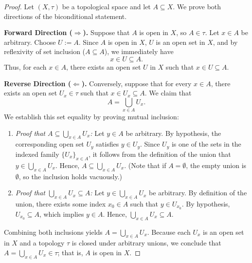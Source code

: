 
\begin{proof}
Let $(X,\tau)$ be a topological space and let $A\subseteq X$. We prove both directions of the
biconditional statement.

\textbf{Forward Direction ($\Longrightarrow$).} Suppose that $A$ is open in $X$, so $A\in\tau$.
Let $x\in A$ be arbitrary. Choose $U:=A$. Since $A$ is open in $X$, $U$ is an open set in $X$,
and by reflexivity of set inclusion ($A\subseteq A$), we immediately have
\[ x\in U\subseteq A. \]
Thus, for each $x\in A$, there exists an open set $U$ in $X$ such that $x\in U\subseteq A$.

\textbf{Reverse Direction ($\Longleftarrow$).} Conversely, suppose that for every $x\in A$,
there exists an open set $U_x\in\tau$ such that $x\in U_x\subseteq A$. We claim that
\[ A=\bigcup_{x\in A}U_x. \]
We establish this set equality by proving mutual inclusion:
\begin{enumerate}
  \item \emph{Proof that $A\subseteq\bigcup_{x\in A}U_x$:} Let $y\in A$ be arbitrary. By
        hypothesis, the corresponding open set $U_y$ satisfies $y\in U_y$. Since $U_y$ is one
        of the sets in the indexed family $\{U_x\}_{x\in A}$, it follows from the definition
        of the union that $y\in\bigcup_{x\in A}U_x$. Hence, $A\subseteq\bigcup_{x\in A}U_x$.
        (Note that if $A=\emptyset$, the empty union is $\emptyset$, so the inclusion holds
        vacuously.)
  \item \emph{Proof that $\bigcup_{x\in A}U_x\subseteq A$:} Let $y\in\bigcup_{x\in A}U_x$ be
        arbitrary. By definition of the union, there exists some index $x_0\in A$ such that
        $y\in U_{x_0}$. By hypothesis, $U_{x_0}\subseteq A$, which implies $y\in A$. Hence,
        $\bigcup_{x\in A}U_x\subseteq A$.
\end{enumerate}
Combining both inclusions yields $A=\bigcup_{x\in A}U_x$. Because each $U_x$ is an open set in
$X$ and a topology $\tau$ is closed under arbitrary unions, we conclude that
$A=\bigcup_{x\in A}U_x\in\tau$; that is, $A$ is open in $X$.
\end{proof}
